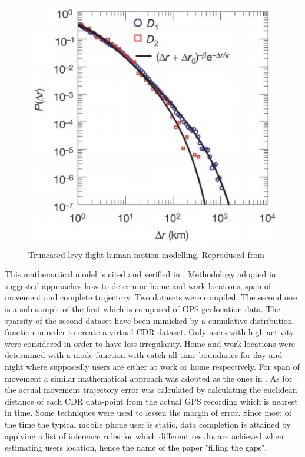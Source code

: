\documentclass[12pt, a4paper]{report}
\theoremstyle{definition}
\theoremstyle{definition}%
\theoremstyle{definition}%
\theoremstyle{definition}%
\theoremstyle{definition}%
\theoremstyle{definition}%
\begin{document}
\begin{figure}[h]	
	\includegraphics[scale=0.75]{truncated_power_law}
	\centering
	\caption{Truncated levy flight human motion modelling. Reproduced from \cite{Gonzalez2008}}
	\label{fig:levy_flight}
\end{figure}

This mathematical model is cited and verified in \cite{Calabrese2013}. Methodology adopted in \cite{Hoteit2016} suggested approaches how to determine home and work locations, span of movement and complete trajectory. Two datasets were compiled. The second one is a sub-sample of the first which is composed of GPS geolocation data. The sparsity of the second dataset have been mimicked by a cumulative distribution function in order to create a virtual CDR dataset. Only users with high activity were considered in order to have less irregularity. Home and work locations were determined with a mode function with catch-all time boundaries for day and night where supposedly users are either at work or home respectively. For span of movement a similar mathematical approach was adopted as the ones in \cite{Hoteit2014,Gonzalez2008}. As for the actual movement trajectory error was calculated by calculating the euclidean distance of each CDR data-point from the actual GPS recording which is nearest in time.
Some techniques were used to lessen the margin of error. Since most of the time the typical mobile phone user is static, data completion is attained by applying a list of inference rules for which different results are achieved when estimating users location, hence the name of the paper "filling the gaps".
\end{document}
